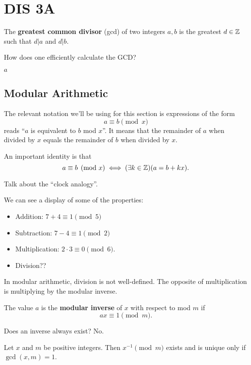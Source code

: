 \section{DIS 3A} 

\begin{definition}
    The \textbf{greatest common divisor} (gcd) of two integers $a, b$ is the greatest $d \in \operatorname{\mathbb{Z}}$ such that $d|a$ and $d|b$. 
\end{definition}

How does one efficiently calculate the GCD?

\begin{algothm}
    \begin{algorithmic}
        \State \Return $a$
    \EndIf
    \State \Return {}
    \EndFunction
    \end{algorithmic}
\end{algothm}

\subsection{Modular Arithmetic}

The relevant notation we'll be using for this section is expressions of the form \[ a \equiv b \pmod{x} \] reads ``$a$ is equivalent to $b$ mod $x$''. It means that the remainder of $a$ when divided by $x$ equals the remainder of $b$ when divided by $x$. 

An important identity is that \[ a \equiv b \pmod{x} \iff (\exists k \in\operatorname{\mathbb{Z}}) (a = b + kx). \]

Talk about the ``clock analogy''. 

\begin{example}
    We can see a display of some of the properties:
    \begin{itemize}
        \item Addition: $7 + 4 \equiv 1 \pmod{5}$
        \item Subtraction: $7 - 4 \equiv 1 \pmod{2}$ 
        \item Multiplication: $2 \cdot 3 \equiv 0 \pmod{6}$. 
        \item Division??
    \end{itemize}
\end{example}

In modular arithmetic, division is not well-defined. The opposite of multiplication is multiplying by the modular inverse. 

\begin{definition}
    The value $a$ is the \textbf{modular inverse} of $x$ with respect to mod $m$ if \[ ax \equiv 1 \pmod{m}. \]
\end{definition}

Does an inverse always exist? No. 

\begin{theorem}
    Let $x$ and $m$ be positive integers. Then $x^{-1} \pmod{m}$ exists and is unique only if $\gcd(x,m) = 1$. 
\end{theorem}